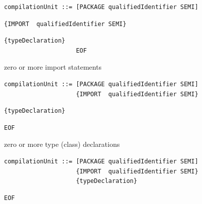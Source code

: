 \documentclass[8pt,a4paper,compress]{beamer}
\begin{document}
\begin{frame}[fragile]
\begin{overprint}
\begin{tcolorbox}[enhanced,drop shadow southwest,sharp corners,size=fbox,colback=white,fontlower=\small\ttfamily,collower=silver900]

\begin{lstlisting}[language={},style=focusout]
compilationUnit ::= [PACKAGE qualifiedIdentifier SEMI]
\end{lstlisting}
\begin{lstlisting}[language={},style=focusin,backgroundcolor=\color{lime100}]
                    {IMPORT  qualifiedIdentifier SEMI}
\end{lstlisting}
\begin{lstlisting}[language={},style=focusout]
                    {typeDeclaration} 
                    EOF
\end{lstlisting}

\tcblower
\begin{minipage}[t][.2cm][t]{\textwidth}
zero or more import statements
\end{minipage}
\end{tcolorbox}

\begin{tcolorbox}[enhanced,drop shadow southwest,sharp corners,size=fbox,colback=white,fontlower=\small\ttfamily,collower=silver900]

\begin{lstlisting}[language={},style=focusout]
compilationUnit ::= [PACKAGE qualifiedIdentifier SEMI]
                    {IMPORT  qualifiedIdentifier SEMI}
\end{lstlisting}
\begin{lstlisting}[language={},style=focusin,backgroundcolor=\color{lime100}]
                    {typeDeclaration} 
\end{lstlisting}
\begin{lstlisting}[language={},style=focusout]
                    EOF
\end{lstlisting}
\tcblower
\begin{minipage}[t][.2cm][t]{\textwidth}
zero or more type (class) declarations
\end{minipage}
\end{tcolorbox}

\begin{tcolorbox}[enhanced,drop shadow southwest,sharp corners,size=fbox,colback=white,fontlower=\small\ttfamily,collower=silver900]

\begin{lstlisting}[language={},style=focusout]
compilationUnit ::= [PACKAGE qualifiedIdentifier SEMI]
                    {IMPORT  qualifiedIdentifier SEMI}
                    {typeDeclaration} 
\end{lstlisting}
\begin{lstlisting}[language={},style=focusin,backgroundcolor=\color{lime100}]
                    EOF
\end{lstlisting}


\end{tcolorbox}
\end{overprint}
\end{frame}
\end{document}
